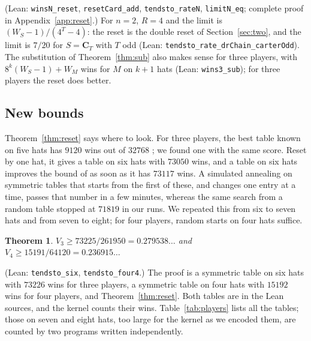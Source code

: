 \documentclass[11pt,a4paper]{article}
\newtheorem{theorem}{Theorem}
\theoremstyle{definition}
\theoremstyle{remark}
\newcommand{\lean}[1]{\texttt{#1}}
\newcommand{\C}{\mathbf{C}}
\begin{document}
(Lean: \lean{winsN\_reset}, \lean{resetCard\_add}, \lean{tendsto\_rateN},
\lean{limitN\_eq}; complete proof in Appendix~\ref{app:reset}.) For $n = 2$, $R = 4$ and the limit is
$(W_S-1)/(4^T-4)$: the reset is the double reset of
Section~\ref{sec:two}, and the limit is $7/20$ for $S = \C_T$ with $T$
odd (Lean: \lean{tendsto\_rate\_drChain\_carterOdd}). The substitution
of Theorem~\ref{thm:sub} also makes sense for three players, with
$8^k(W_S-1)+W_M$ wins for $M$ on $k+1$ hats (Lean: \lean{wins3\_sub});
for three players the reset does better.

\subsection{New bounds}

Theorem~\ref{thm:reset} says where to look. For three players, the best
table known on five hats has $9120$ wins out of $32768$ \cite{BFG}; we
found one with the same score. Reset by one hat, it gives a table on six
hats with $73050$ wins, and a table on six hats improves the bound of
\cite{BFG} as soon as it has $73117$ wins. A simulated annealing on
symmetric tables that starts from the first of these, and changes one
entry at a time, passes that number in a few minutes, whereas the same
search from a random table stopped at $71819$ in our runs. We repeated this from
six to seven hats and from seven to eight; for four players, random
starts on four hats suffice.

\begin{theorem}\label{thm:bounds}
$V_3 \ge 73225/261950 = 0.279538\ldots$ and
$V_4 \ge 15191/64120 = 0.236915\ldots$
\end{theorem}

(Lean: \lean{tendsto\_six}, \lean{tendsto\_four4}.) The proof is a
symmetric table on six hats with $73226$ wins for three players, a
symmetric table on four hats with $15192$ wins for four players, and
Theorem~\ref{thm:reset}. Both tables are in the Lean sources, and the
kernel counts their wins. Table~\ref{tab:players} lists all the tables;
those on seven and eight hats, too large for the kernel as we encoded
them, are counted by two programs written independently.
\end{document}
